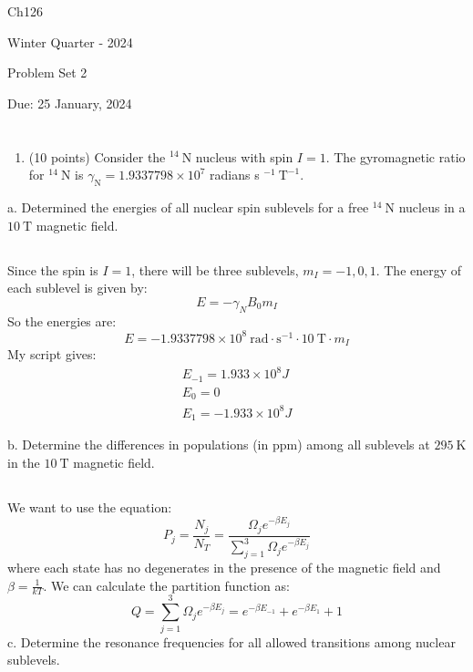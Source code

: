 \documentclass[12pt]{article}
\begin{document}
Ch126

Winter Quarter - 2024

Problem Set 2

Due: 25 January, 2024
\section{}
\begin{enumerate}
  \item (10 points) Consider the ${ }^{14} \mathrm{~N}$ nucleus with spin $I=1$. The gyromagnetic ratio for ${ }^{14} \mathrm{~N}$ is $\gamma_{\mathrm{N}}=1.9337798 \times 10^{7}$ radians s $^{-1} \mathrm{~T}^{-1}$.
\end{enumerate}

a. Determined the energies of all nuclear spin sublevels for a free ${ }^{14} \mathrm{~N}$ nucleus in a $10 \mathrm{~T}$ magnetic field.
\subsection{}
Since the spin is $I=1$, there will be three sublevels, $m_I = -1, 0, 1$. The energy of each sublevel is given by:
\begin{equation}
  E = -\gamma_N B_0 m_I
\end{equation}
So the energies are:
\begin{equation}
  E = -1.9337798 \times 10^{8} \mathrm{~rad} \cdot \mathrm{s}^{-1} \cdot 10 \mathrm{~T} \cdot m_I
\end{equation}
My script gives:
\begin{align}
  E_{-1} = 1.933 \times 10^{8} J\\
  E_{0} = 0\\
  E_{1} = -1.933 \times 10^{8} J
\end{align}

b. Determine the differences in populations (in ppm) among all sublevels at $295 \mathrm{~K}$ in the $10 \mathrm{~T}$ magnetic field.
\subsection{}
We want to use the equation:
\begin{equation}
  P_{j} = \frac{N_{j}}{N_{T}} = \frac{\Omega _{j}e^{-\beta E_{j}}}{\sum_{j=1}^{3} \Omega _{j}e^{-\beta E_{j}}}
\end{equation}
where each state has no degenerates in the presence of the magnetic field and $\beta = \frac{1}{kT}$. We can calculate the partition function as:
\begin{equation}
  Q = \sum_{j=1}^{3} \Omega _{j}e^{-\beta E_{j}} = e^{-\beta E_{-1}} + e^{-\beta E_1} + 1
\end{equation}
c. Determine the resonance frequencies for all allowed transitions among nuclear sublevels.
\end{document}
